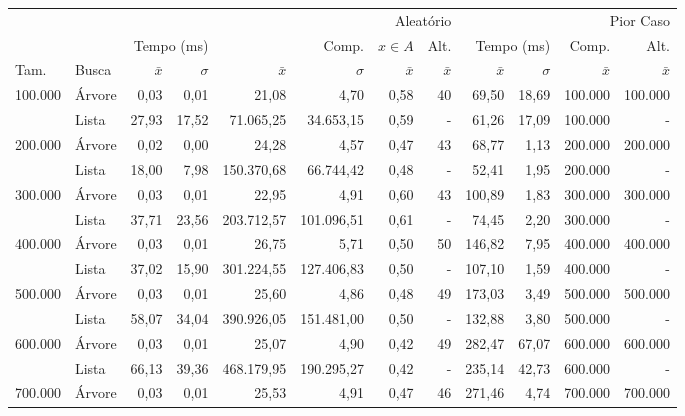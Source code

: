 \begin{tabular}{llrrrrrrrrrr}
\toprule
 &  & \multicolumn{6}{r}{Aleatório} & \multicolumn{4}{r}{Pior Caso} \\
 \cmidrule(lr){3-8} \cmidrule(lr){9-12}
 &  & \multicolumn{2}{r}{Tempo (ms)} & \multicolumn{2}{r}{Comp.} & $x \in A$ & Alt. & \multicolumn{2}{r}{Tempo (ms)} & Comp. & Alt. \\
 \cmidrule(lr){3-4} \cmidrule(lr){5-6} \cmidrule(lr){7-7} \cmidrule(lr){8-8} \cmidrule(lr){9-10} \cmidrule(lr){11-11} \cmidrule(lr){12-12}
Tam. & Busca & $\bar{x}$ & $\sigma$ & $\bar{x}$ & $\sigma$ & $\bar{x}$ & $\bar{x}$ & $\bar{x}$ & $\sigma$ & $\bar{x}$ & $\bar{x}$ \\
\midrule
\multirow[c]{2}{*}{100.000} & Árvore & 0,03 & 0,01 & 21,08 & 4,70 & 0,58 & 40 & 69,50 & 18,69 & 100.000 & 100.000 \\
 & Lista & 27,93 & 17,52 & 71.065,25 & 34.653,15 & 0,59 & - & 61,26 & 17,09 & 100.000 & - \\
\cline{1-12}
\multirow[c]{2}{*}{200.000} & Árvore & 0,02 & 0,00 & 24,28 & 4,57 & 0,47 & 43 & 68,77 & 1,13 & 200.000 & 200.000 \\
 & Lista & 18,00 & 7,98 & 150.370,68 & 66.744,42 & 0,48 & - & 52,41 & 1,95 & 200.000 & - \\
\cline{1-12}
\multirow[c]{2}{*}{300.000} & Árvore & 0,03 & 0,01 & 22,95 & 4,91 & 0,60 & 43 & 100,89 & 1,83 & 300.000 & 300.000 \\
 & Lista & 37,71 & 23,56 & 203.712,57 & 101.096,51 & 0,61 & - & 74,45 & 2,20 & 300.000 & - \\
\cline{1-12}
\multirow[c]{2}{*}{400.000} & Árvore & 0,03 & 0,01 & 26,75 & 5,71 & 0,50 & 50 & 146,82 & 7,95 & 400.000 & 400.000 \\
 & Lista & 37,02 & 15,90 & 301.224,55 & 127.406,83 & 0,50 & - & 107,10 & 1,59 & 400.000 & - \\
\cline{1-12}
\multirow[c]{2}{*}{500.000} & Árvore & 0,03 & 0,01 & 25,60 & 4,86 & 0,48 & 49 & 173,03 & 3,49 & 500.000 & 500.000 \\
 & Lista & 58,07 & 34,04 & 390.926,05 & 151.481,00 & 0,50 & - & 132,88 & 3,80 & 500.000 & - \\
\cline{1-12}
\multirow[c]{2}{*}{600.000} & Árvore & 0,03 & 0,01 & 25,07 & 4,90 & 0,42 & 49 & 282,47 & 67,07 & 600.000 & 600.000 \\
 & Lista & 66,13 & 39,36 & 468.179,95 & 190.295,27 & 0,42 & - & 235,14 & 42,73 & 600.000 & - \\
\cline{1-12}
\multirow[c]{2}{*}{700.000} & Árvore & 0,03 & 0,01 & 25,53 & 4,91 & 0,47 & 46 & 271,46 & 4,74 & 700.000 & 700.000 \\

\end{tabular}
